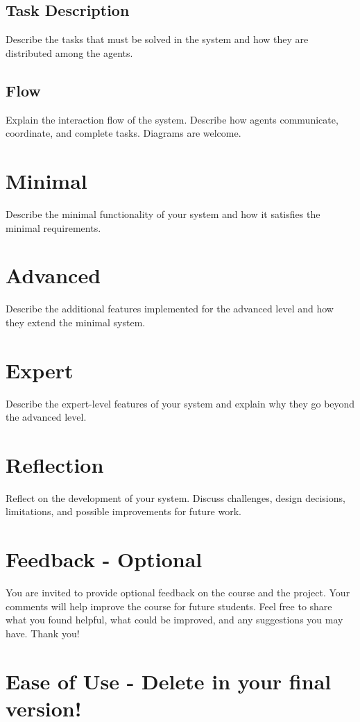 \documentclass[conference]{IEEEtran}
\begin{document}
\subsection{Task Description}
Describe the tasks that must be solved in the system and how they are distributed 
among the agents.

\subsection{Flow}
Explain the interaction flow of the system. Describe how agents communicate, 
coordinate, and complete tasks. Diagrams are welcome.

\section{Minimal}
Describe the minimal functionality of your system and how it satisfies the minimal requirements.

\section{Advanced}
Describe the additional features implemented for the advanced level and how they extend the minimal system.

\section{Expert}
Describe the expert-level features of your system and explain why they go beyond the advanced level.

\section{Reflection}
Reflect on the development of your system. Discuss challenges, design decisions, 
limitations, and possible improvements for future work.

\section{Feedback - Optional}
You are invited to provide optional feedback on the course and the project.
Your comments will help improve the course for future students. Feel free to share what you found helpful, what could be improved, and any suggestions you may have. Thank you!


\section{Ease of Use - Delete in your final version!}
\end{document}
